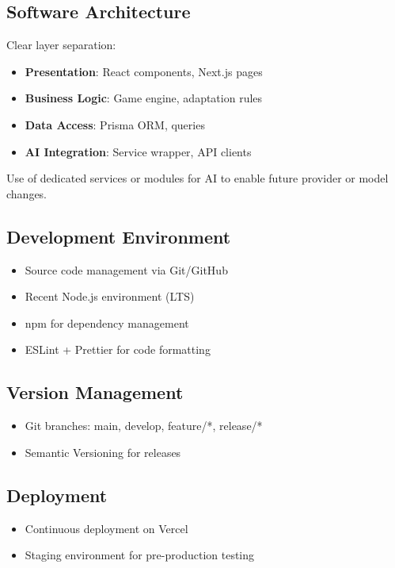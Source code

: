 \documentclass[12pt,a4paper]{article}
\begin{document}
\subsection{Software Architecture}

Clear layer separation:
\begin{itemize}
    \item \textbf{Presentation}: React components, Next.js pages
    \item \textbf{Business Logic}: Game engine, adaptation rules
    \item \textbf{Data Access}: Prisma ORM, queries
    \item \textbf{AI Integration}: Service wrapper, API clients
\end{itemize}

Use of dedicated services or modules for AI to enable future provider or model changes.

\subsection{Development Environment}

\begin{itemize}
    \item Source code management via Git/GitHub
    \item Recent Node.js environment (LTS)
    \item npm for dependency management
    \item ESLint + Prettier for code formatting
\end{itemize}

\subsection{Version Management}

\begin{itemize}
    \item Git branches: main, develop, feature/*, release/*
    \item Semantic Versioning for releases
\end{itemize}

\subsection{Deployment}

\begin{itemize}
    \item Continuous deployment on Vercel
    \item Staging environment for pre-production testing
\end{itemize}
\end{document}
